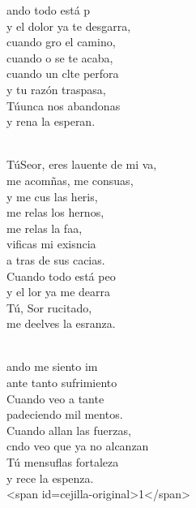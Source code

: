 \documentclass[12pt]{article}
\begin{document}
\begin{multicols*}{2}
\begin{cancion}%
	ando todo está p\\
y el dolor ya te desgarra,\\
	cuando gro el camino, \\
	cuando o se te acaba,\\
	cuando un clte perfora \\
	y tu razón traspasa,\\
	Túunca nos abandonas \\
	y rena la esperan.\\\jump\\
	\begin{chorus}%
	TúSeor, eres lauente de mi va, \\
	me acomñas, me consuas,\\
	y me cus las heris,\\
	me relas los hernos, \\
	me relas la faa,\\
	vificas mi exisncia\\
	a tras de sus cacias. \\
\jump
	Cuando todo está peo\\
	y el lor ya me dearra\\
	Tú, Sor rucitado, \\
	me deelves la esranza.\\
	\end{chorus}%
	\jump\\
	ando me siento im\\
ante tanto sufrimiento\\
	Cuando veo a tante\\
	padeciendo mil mentos.\\
	Cuando allan las fuerzas,\\
	cndo veo que ya no alcanzan\\
	Tú mensuflas fortaleza \\
	y rece la espenza.\\
<span id=cejilla-original>1</span>\\
\end{cancion}%


\end{multicols*}
\end{document}
